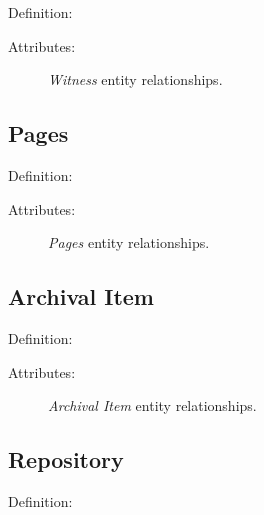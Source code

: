 Definition: 

\vspace{1em}
\noindent Attributes:

\begin{figure}[ht]
    \begin{center}
        
    \end{center}
\label{fig:WitnessER}
\caption{\textit{Witness} entity relationships.}
\end{figure}


\subsection{Pages}

Definition: 

\vspace{1em}
\noindent Attributes:

\begin{figure}[ht]
    \begin{center}
        
    \end{center}
\label{fig:PagesER}
\caption{\textit{Pages} entity relationships.}
\end{figure}


\subsection{Archival Item}

Definition: 

\vspace{1em}
\noindent Attributes:

\begin{figure}[ht]
    \begin{center}
        
    \end{center}
\label{fig:ArchivalER}
\caption{\textit{Archival Item} entity relationships.}
\end{figure}


\subsection{Repository}

Definition: 

